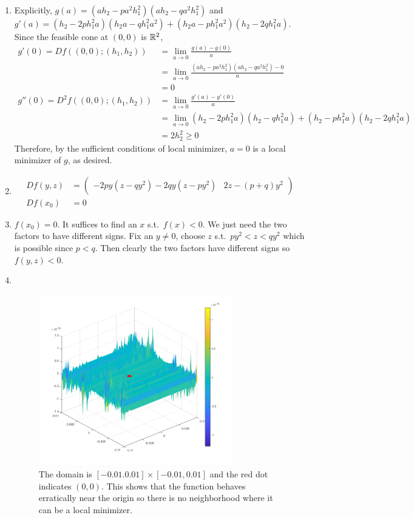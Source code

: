 \documentclass[12pt]{article}
\begin{document}
\begin{problem}[9]
\begin{enumerate}[label=(\alph*)]
	\item Explicitly, $ g(a) = (ah_2-pa^2h_1^2)(ah_2-qa^2h_1^2)$ and $ g'(a) = (h_2-2ph_1^2a)(h_2a-qh_1^2a^2)+(h_2a-ph_1^2a^2)(h_2-2qh_1^2a)$. Since the feasible cone at $ (0,0)$ is  $ \mathbb{R}^2$,
	\begin{align*}
		g'(0)=Df((0,0);(h_1,h_2)) &= \lim_{ a \to 0} \frac{g(a)-g(0)}{ a} \\
		&= \lim_{ a \to 0} \frac{(ah_2-pa^2h_1^2)(ah_2-qa^2h_1^2)-0}{ a} \\
		&=0  \\
		g''(0) = D^2f((0,0);(h_1,h_2)) &= \lim_{ a \to 0} \frac{g'(a)-g'(0)}{ a} \\
		&= \lim_{ a \to 0} (h_2-2ph_1^2 a)(h_2-qh_1^2a) + (h_2-ph_1^2a)(h_2-2qh_1^2 a) \\
		&= 2h_2^2  \geq 0
	\end{align*}
	Therefore, by the sufficient conditions of local minimizer, $ a=0$ is a local minimizer of  $ g$, as desired.
\item 
	\begin{align*}
		Df(y,z)&= \begin{pmatrix} -2py(z-qy^2)-2qy(z-py^2)& 2z-(p+q)y^2 \end{pmatrix}  \\
		Df(x_0) &= 0 
	\end{align*}
\item $ f(x_0) = 0$. It suffices to find an $ x$  s.t.\ $ f(x)<0$. We just need the two factors to have different signs. Fix an $ y\neq 0$, choose  $ z$  s.t.\ $ py^2<z<qy^2$ which is possible since $ p<q$. Then clearly the two factors have different signs so $ f(y,z)<0$.
\item 
~\begin{figure}[H]
	\centering
	\includegraphics[width=0.8\textwidth]{./figures/hw01_plot.png}
	\caption{The domain is $ [-0.01.0.01] \times [-0.01,0.01]$ and the red dot indicates $(0,0)$. This shows that the function behaves erratically near the origin so there is no neighborhood where it can be a local minimizer.}
\end{figure}
\end{enumerate}
\end{problem}
\end{document}
